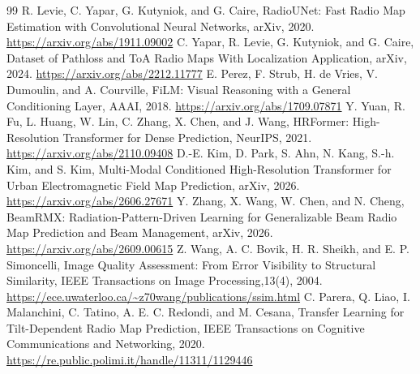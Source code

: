 \documentclass[conference]{IEEEtran}
\begin{document}
\begin{thebibliography}{99}
 R. Levie, C. Yapar, G. Kutyniok, and G. Caire, RadioUNet: Fast Radio Map Estimation with Convolutional Neural Networks, arXiv, 2020. \url{https://arxiv.org/abs/1911.09002}
 C. Yapar, R. Levie, G. Kutyniok, and G. Caire, Dataset of Pathloss and ToA Radio Maps With Localization Application, arXiv, 2024. \url{https://arxiv.org/abs/2212.11777}
 E. Perez, F. Strub, H. de Vries, V. Dumoulin, and A. Courville, FiLM: Visual Reasoning with a General Conditioning Layer, AAAI, 2018. \url{https://arxiv.org/abs/1709.07871}
 Y. Yuan, R. Fu, L. Huang, W. Lin, C. Zhang, X. Chen, and J. Wang, HRFormer: High-Resolution Transformer for Dense Prediction, NeurIPS, 2021. \url{https://arxiv.org/abs/2110.09408}
 D.-E. Kim, D. Park, S. Ahn, N. Kang, S.-h. Kim, and S. Kim, Multi-Modal Conditioned High-Resolution Transformer for Urban Electromagnetic Field Map Prediction, arXiv, 2026. \url{https://arxiv.org/abs/2606.27671}
 Y. Zhang, X. Wang, W. Chen, and N. Cheng, BeamRMX: Radiation-Pattern-Driven Learning for Generalizable Beam Radio Map Prediction and Beam Management, arXiv, 2026. \url{https://arxiv.org/abs/2609.00615}
 Z. Wang, A. C. Bovik, H. R. Sheikh, and E. P. Simoncelli, Image Quality Assessment: From Error Visibility to Structural Similarity, IEEE Transactions on Image Processing,13(4), 2004. \url{https://ece.uwaterloo.ca/~z70wang/publications/ssim.html}
 C. Parera, Q. Liao, I. Malanchini, C. Tatino, A. E. C. Redondi, and M. Cesana, Transfer Learning for Tilt-Dependent Radio Map Prediction, IEEE Transactions on Cognitive Communications and Networking, 2020. \url{https://re.public.polimi.it/handle/11311/1129446}
\end{thebibliography}
\end{document}
